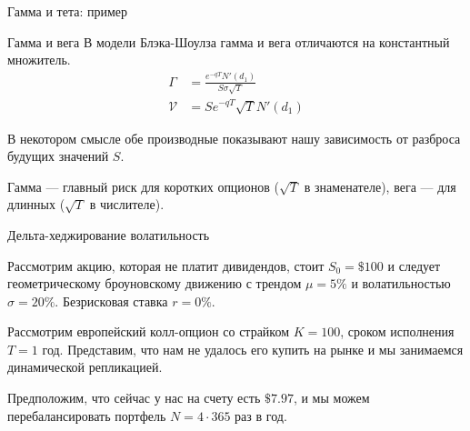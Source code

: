 \documentclass{beamer}
\begin{document}
\begin{frame}{Гамма и тета: пример}
\centering
{}
\end{frame}



\begin{frame}{Гамма и вега}
\justify
В модели Блэка-Шоулза гамма и вега отличаются на константный множитель.
\begin{align*}
\Gamma &= \frac{e^{-qT}N'(d_1)}{S\sigma\sqrt{T}} \\
\mathcal{V} &= Se^{-qT}\sqrt{T}N'(d_1)
\end{align*}

\justify
В некотором смысле обе производные показывают нашу зависимость от разброса будущих значений $S$.

\justify
Гамма --- главный риск для коротких опционов ($\sqrt{T}$ в знаменателе), вега --- для длинных ($\sqrt{T}$ в числителе). 
\end{frame}



\begin{frame}{Дельта-хеджирование волатильность}

\justify
Рассмотрим акцию, которая не платит дивидендов, стоит $S_0=\$100$ и следует 
геометрическому броуновскому движению с трендом $\mu=5\%$ и волатильностью
$\sigma=20\%$. Безрисковая ставка $r=0\%$.

\justify
Рассмотрим европейский колл-опцион со страйком $K=100$, сроком исполнения $T=1$ год. 
Представим, что нам не удалось его купить на рынке и мы занимаемся динамической 
репликацией.

\justify
Предположим, что сейчас у нас на счету есть $\$7.97$, и мы можем 
перебалансировать портфель $N=4\cdot365$ раз в год.

\end{frame}
\end{document}
